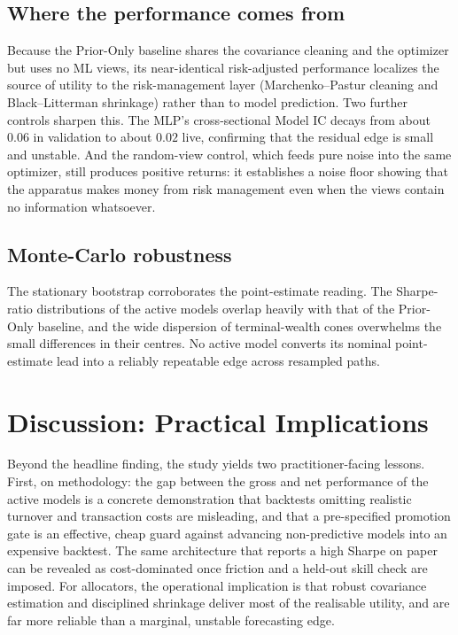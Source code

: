 \documentclass[11pt]{article}
\begin{document}
\subsection{Where the performance comes from}
Because the Prior-Only baseline shares the covariance cleaning and the optimizer but uses no ML
views, its near-identical risk-adjusted performance localizes the source of utility to the
risk-management layer (Marchenko--Pastur cleaning and Black--Litterman shrinkage) rather than to
model prediction. Two further controls sharpen this. The MLP's cross-sectional Model IC decays
from about $0.06$ in validation to about $0.02$ live, confirming that the residual edge is small
and unstable. And the random-view control, which feeds pure noise into the same optimizer, still
produces positive returns: it establishes a noise floor showing that the apparatus makes money
from risk management even when the views contain no information whatsoever.

\subsection{Monte-Carlo robustness}
The stationary bootstrap corroborates the point-estimate reading. The Sharpe-ratio distributions
of the active models overlap heavily with that of the Prior-Only baseline, and the wide dispersion
of terminal-wealth cones overwhelms the small differences in their centres. No active model
converts its nominal point-estimate lead into a reliably repeatable edge across resampled paths.

\section{Discussion: Practical Implications}
Beyond the headline finding, the study yields two practitioner-facing lessons. First, on
methodology: the gap between the gross and net performance of the active models is a concrete
demonstration that backtests omitting realistic turnover and transaction costs are misleading, and
that a pre-specified promotion gate is an effective, cheap guard against advancing non-predictive
models into an expensive backtest. The same architecture that reports a high Sharpe on paper can
be revealed as cost-dominated once friction and a held-out skill check are imposed. For allocators,
the operational implication is that robust covariance estimation and disciplined shrinkage deliver
most of the realisable utility, and are far more reliable than a marginal, unstable forecasting
edge.
\end{document}
